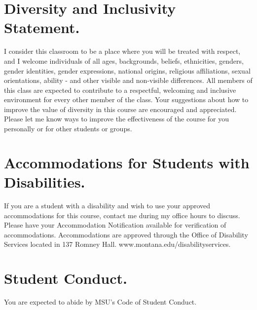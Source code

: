 \documentclass[letterpaper]{inzane_syllabus} %
\begin{document}

\vspace{0.25cm}
\section{Diversity and Inclusivity Statement.} I consider this classroom to be a place where you will be treated with respect, and I welcome individuals of all ages, backgrounds, beliefs, ethnicities, genders, gender identities, gender expressions, national origins, religious affiliations, sexual orientations, ability - and other visible and non-visible differences. All members of this class are expected to contribute to a respectful, welcoming and inclusive environment for every other member of the class.  Your suggestions about how to improve the value of diversity in this course are encouraged and appreciated. Please let me know ways to improve the effectiveness of the course for you personally or for other students or  groups.
 
\vspace{0.25cm}
\section{Accommodations for Students with Disabilities.} If you are a student with a disability and wish to use your approved accommodations for this course, contact me during my office hours to discuss. Please have your Accommodation Notification available for verification of accommodations. Accommodations are approved through the Office of Disability Services located in 137 Romney Hall.  www.montana.edu/disabilityservices.

\vspace{0.25cm}
\section{Student Conduct.} You are expected to abide by MSU's Code of Student Conduct.
%
%
\end{document}
